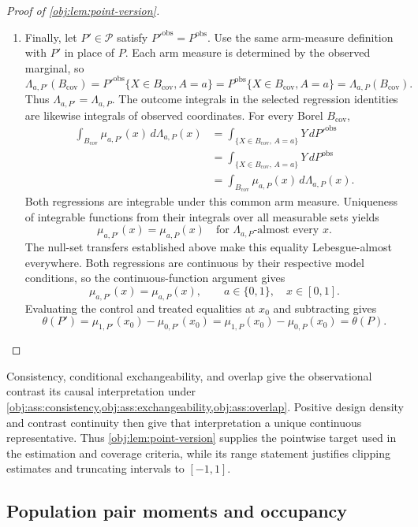 \documentclass[11pt]{article}
\begin{document}
\begin{proof}[Proof of \cref{obj:lem:point-version}]
\begin{enumerate}
\item Finally, let \(P'\in\mathcal P\) satisfy \(P'^{\mathrm{obs}}=P^{\mathrm{obs}}\). Use the same arm-measure definition with \(P'\) in place of \(P\). Each arm measure is determined by the observed marginal, so
\[
\Lambda_{a,P'}(B_{\mathrm{cov}})
=P'^{\mathrm{obs}}\{X\in B_{\mathrm{cov}},A=a\}
=P^{\mathrm{obs}}\{X\in B_{\mathrm{cov}},A=a\}
=\Lambda_{a,P}(B_{\mathrm{cov}}).
\]
Thus \(\Lambda_{a,P'}=\Lambda_{a,P}\). The outcome integrals in the selected regression identities are likewise integrals of observed coordinates. For every Borel \(B_{\mathrm{cov}}\),
\[
\begin{aligned}
\int_{B_{\mathrm{cov}}}\mu_{a,P'}(x)\,d\Lambda_{a,P}(x)
&=\int_{\{X\in B_{\mathrm{cov}},\,A=a\}}Y\,dP'^{\mathrm{obs}}\\
&=\int_{\{X\in B_{\mathrm{cov}},\,A=a\}}Y\,dP^{\mathrm{obs}}\\
&=\int_{B_{\mathrm{cov}}}\mu_{a,P}(x)\,d\Lambda_{a,P}(x).
\end{aligned}
\]
Both regressions are integrable under this common arm measure. Uniqueness of integrable functions from their integrals over all measurable sets yields
\[
\mu_{a,P'}(x)=\mu_{a,P}(x)
\quad\text{for }\Lambda_{a,P}\text{-almost every }x.
\]
The null-set transfers established above make this equality Lebesgue-almost everywhere. Both regressions are continuous by their respective model conditions, so the continuous-function argument gives
\[
\mu_{a,P'}(x)=\mu_{a,P}(x),
\qquad a\in\{0,1\},\quad x\in[0,1].
\]
Evaluating the control and treated equalities at \(x_0\) and subtracting gives
\[
\theta(P')
=\mu_{1,P'}(x_0)-\mu_{0,P'}(x_0)
=\mu_{1,P}(x_0)-\mu_{0,P}(x_0)
=\theta(P).
\] %
\end{enumerate}
\end{proof}

Consistency, conditional exchangeability, and overlap give the observational contrast its causal interpretation under \cref{obj:ass:consistency,obj:ass:exchangeability,obj:ass:overlap}. Positive design density and contrast continuity then give that interpretation a unique continuous representative. Thus \cref{obj:lem:point-version} supplies the pointwise target used in the estimation and coverage criteria, while its range statement justifies clipping estimates and truncating intervals to \([-1,1]\).

\subsection{Population pair moments and occupancy}
\end{document}
